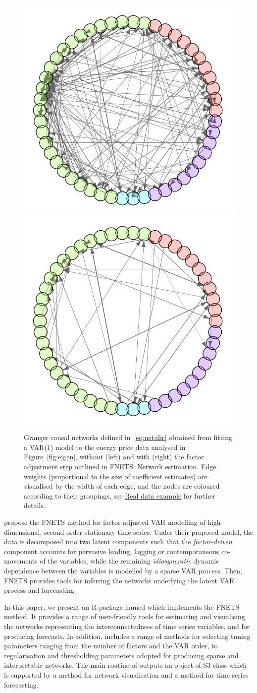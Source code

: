 \begin{figure}[htb!]
\centering
\includegraphics[width = .4\textwidth]{figs/q0.pdf}
\includegraphics[width = .4\textwidth]{figs/q1.pdf}
\caption{Granger causal networks defined in~\eqref{eq:net:dir} obtained from fitting a VAR($1$) model to the energy price data analysed in Figure~\ref{fig:eigen}, without (left) and with (right) the factor adjustment step outlined in \hyperref[sec:estimation]{FNETS: Network estimation}. 
Edge weights (proportional to the size of coefficient estimates) are visualised by the width of each edge, and the nodes are coloured according to their groupings, see \hyperref[sec:real]{Real data example} for further details.}
\label{fig:q0q1}
\end{figure}

\cite{barigozzi2022fnets} propose the FNETS method for factor-adjusted VAR modelling of high-dimensional, second-order stationary time series.
Under their proposed model, the data is decomposed into two latent components such that the {\it factor-driven} component accounts for pervasive leading, lagging or contemporaneous co-movements of the variables, while the remaining {\it idiosyncratic} dynamic dependence between the variables is modelled by a sparse VAR process.
Then, FNETS provides tools for inferring the networks underlying the latent VAR process and forecasting.

In this paper, we present an R package named  which implements the FNETS method.
It provides a range of user-friendly tools for estimating and visualising the networks representing the interconnectedness of time series variables, and for producing forecasts.
In addition,  includes a range of methods for selecting tuning parameters ranging from the number of factors and the VAR order, to regularisation and thresholding parameters adopted for producing sparse and interpretable networks.
The main routine of  outputs an object of S3 class  which is supported by a  method for network visualisation and a  method for time series forecasting.

